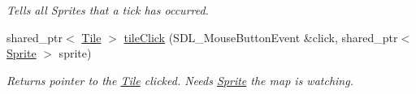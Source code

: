 \begin{DoxyCompactItemize}
\begin{DoxyCompactList}\small\item\em Tells all Sprites that a tick has occurred. \end{DoxyCompactList}\item 
shared\+\_\+ptr$<$ \hyperlink{class_tile}{Tile} $>$ \hyperlink{class_terr_ab1b055dc8ce5abea86d84472e27ceb48}{tile\+Click} (S\+D\+L\+\_\+\+Mouse\+Button\+Event \&click, shared\+\_\+ptr$<$ \hyperlink{class_sprite}{Sprite} $>$ sprite)\hypertarget{class_terr_ab1b055dc8ce5abea86d84472e27ceb48}{}\label{class_terr_ab1b055dc8ce5abea86d84472e27ceb48}

\begin{DoxyCompactList}\small\item\em Returns pointer to the \hyperlink{class_tile}{Tile} clicked. Needs \hyperlink{class_sprite}{Sprite} the map is watching. \end{DoxyCompactList}\end{DoxyCompactItemize}
